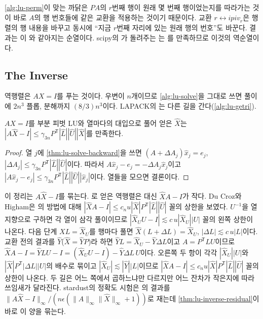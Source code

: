 \cref{alg:lu-perm}이 맞는 까닭은 $PA$의 $r$번째 행이 원래 몇 번째 행이었는지를 따라가는 것이 바로 $A$의 행 번호들에 같은 교환을 적용하는 것이기 때문이다. 교환 $r\leftrightarrow\mathit{ipiv}_r$은 행렬의 행 내용을 바꾸고 동시에 ``지금 $r$번째 자리에 있는 원래 행의 번호''도 바꾼다. 결과는 이 와 같아지는 순열이다. scipy의 가 돌려주는 는 를 만족하므로 이것의 역순열이다.

\subsection{The Inverse}

역행렬은 $AX=I$를 푸는 것이다. 우변이 $n$개이므로 \cref{alg:lu-solve}을 그대로 쓰면 풀이에 $2n^3$ 플롭, 분해까지 $(8/3)n^3$이다. LAPACK의 는 다른 길을 간다(\cref{alg:lu-getri}).

\begin{theorem}
\label{thm:lu-inverse-residual}
$AX=I$를 부분 피벗 LU와 열마다의 대입으로 풀어 얻은 $\hat X$는 $|A\hat X-I|\le\gamma_{3n}P^{\mathsf T}|\hat L||\hat U||\hat X|$를 만족한다.
\end{theorem}

\begin{proof}
열 $j$에 \cref{thm:lu-solve-backward}을 쓰면 $(A+\Delta A_j)\hat x_j=e_j$, $|\Delta A_j|\le\gamma_{3n}P^{\mathsf T}|\hat L||\hat U|$이다. 따라서 $A\hat x_j-e_j=-\Delta A_j\hat x_j$이고 $|A\hat x_j-e_j|\le\gamma_{3n}P^{\mathsf T}|\hat L||\hat U||\hat x_j|$이다. 열들을 모으면 결론이다.
\end{proof}

이 정리는  $A\hat X-I$를 묶는다. 로 얻은 역행렬은 대신  $\hat XA-I$가 작다. Du Croz와 Higham은 의 방법에 대해 $|\hat XA-I|\le c_nu|\hat X|P^{\mathsf T}|\hat L||\hat U|$ 꼴의 상한을 보였다\cite{ducroz1992inversion}. $U^{-1}$을 열 지향으로 구하면 각 열이 삼각 풀이이므로 $|\hat X_UU-I|\lesssim c\,u|\hat X_U||U|$ 꼴의 왼쪽 상한이 나온다. 다음 단계 $XL=\hat X_U$를 행마다 풀면 $\hat X(L+\Delta L)=\hat X_U$, $|\Delta L|\lesssim c\,u|L|$이다. 교환 전의 결과를 $\hat Y$($\hat X=\hat YP$)라 하면 $\hat YL=\hat X_U-\hat Y\Delta L$이고 $A=P^{\mathsf T}LU$이므로 $\hat XA-I=\hat YLU-I=(\hat X_UU-I)-\hat Y\Delta L\,U$이다. 오른쪽 두 항이 각각 $|\hat X_U||U|$와 $|\hat X|P^{\mathsf T}|\Delta L||U|$의 배수로 묶이고 $|\hat X_U|\lesssim|\hat Y||L|$이므로 $|\hat XA-I|\le c_nu|\hat X|P^{\mathsf T}|\hat L||\hat U|$ 꼴의 상한이 나온다. 두 길은 어느 쪽에서 곱하느냐만 다르지만 어느 잔차가 작은지에 따라 쓰임새가 달라진다. stardust의 정확도 시험은 의 결과를 $\|A\hat X-I\|_\infty/(n\epsilon(\|A\|_\infty\|\hat X\|_\infty+1))$로 재는데 \cref{thm:lu-inverse-residual}이 바로 이 양을 묶는다.


